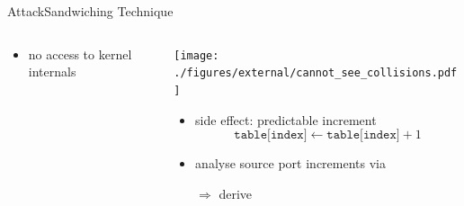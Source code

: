 \documentclass[aspectratio=169, hyperref={colorlinks=true, allcolors=SecondaryColor}, c]{beamer}
\begin{document}
\begin{frame}[fragile]{Attack}{Sandwiching Technique}
	\begin{columns}
		\begin{column}[t]{0.4\textwidth}
			\vspace{0cm}

			\begin{itemize}
				\item no access to \alert{kernel internals} %
			\end{itemize}
			\vspace{0.3cm}

		\end{column}
		\begin{column}[t]{0.6\textwidth}
			\vspace{0cm}

			\texttt{[image: ./figures/external/cannot\_see\_collisions.pdf]}
			\begin{itemize}
				\item \alert{side effect}: predictable increment
				\[
					\texttt{table[index]} \leftarrow \texttt{table[index]} + 1
				\]
				\item analyse source port increments via 
				\item[\alert{$\Rightarrow$}] derive 
			\end{itemize}

		\end{column}
	\end{columns}
\end{frame}
\end{document}
